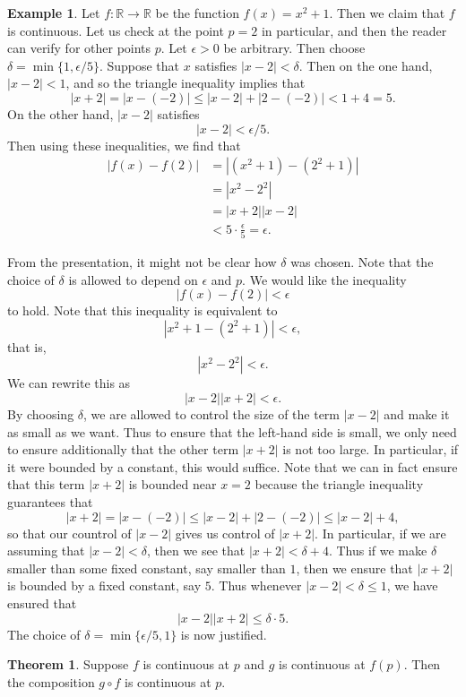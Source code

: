\documentclass[12pt]{article}
\theoremstyle{definition}
\newtheorem{example}[definition]{Example}
\theoremstyle{theorem}
\newtheorem{theorem}[definition]{Theorem}
\begin{document}
\begin{example}
Let $f : \mathbb{R} \to \mathbb{R}$ be the function $f(x) = x^2 + 1$. Then we claim that $f$ is continuous. Let us check at the point $p = 2$ in particular, and then the reader can verify for other points $p$. Let $\epsilon > 0$ be arbitrary. Then choose $\delta = \min\{1, \epsilon/5\}$. Suppose that $x$ satisfies $|x - 2| < \delta$. Then on the one hand, $|x - 2| < 1$, and so the triangle inequality implies that 
\[
|x+2| = |x - (-2)| \leqslant |x -2| + |2 - (-2)| < 1 + 4 =5.
\]
On the other hand, $|x - 2|$ satisfies 
\[
|x - 2| < \epsilon/5.
\]
Then using these inequalities, we find that 
\begin{align*}
|f(x) - f(2)| &= |(x^2 + 1) - (2^2 + 1)| \\
&= |x^2 - 2^2| \\
&= |x+2||x-2| \\
&< 5 \cdot \frac{\epsilon}{5}  = \epsilon.
\end{align*}

From the presentation, it might not be clear how $\delta$ was chosen. Note that the choice of $\delta$ is allowed to depend on $\epsilon$ and $p$. We would like the inequality 
\[
|f(x) - f(2)| < \epsilon
\]
to hold. Note that this inequality is equivalent to 
\[
|x^2 + 1 - (2^2 + 1)| < \epsilon,
\]
that is, 
\[
|x^2 - 2^2| < \epsilon.
\]
We can rewrite this as 
\[
|x - 2||x+2| < \epsilon.
\]
By choosing $\delta$, we are allowed to control the size of the term $|x - 2|$ and make it as small as we want. Thus to ensure that the left-hand side is small, we only need to ensure additionally that the other term $|x+2|$ is not too large. In particular, if it were bounded by a constant, this would suffice. Note that we can in fact ensure that this term $|x + 2|$ is bounded near $x = 2$ because the triangle inequality guarantees that 
\[
|x+ 2| = |x - (-2)| \leqslant |x - 2| + |2 - (-2)| \leqslant |x-2| + 4,
\]
so that our countrol of $|x-2|$ gives us control of $|x+2|$. In particular, if we are assuming that $|x-2| < \delta$, then we see that $|x+2| < \delta + 4$. Thus if we make $\delta$ smaller than some fixed constant, say smaller than $1$, then we ensure that $|x+2|$ is bounded by a fixed constant, say $5$. Thus whenever $|x-2| < \delta \leqslant 1$, we have ensured that 
\[
|x-2||x+2| \leqslant \delta \cdot 5.
\]
The choice of $\delta = \min\{\epsilon/5, 1\}$ is now justified. 
\end{example}

\begin{theorem}
Suppose $f$ is continuous at $p$ and $g$ is continuous at $f(p)$. Then the composition $g \circ f$ is continuous at $p$. 
\end{theorem}
\end{document}
